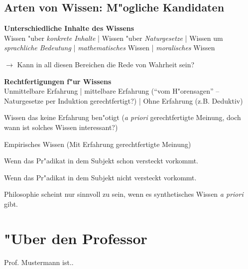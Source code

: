 \documentclass[emulatestandardclasses]{scrartcl}
\begin{document}
\subsection{Arten von Wissen: M"ogliche Kandidaten}
\textbf{Unterschiedliche Inhalte des Wissens}\\
Wissen "uber \emph{konkrete Inhalte} | Wissen "uber \emph{Naturgesetze} | Wissen um \emph{sprachliche Bedeutung} | \emph{mathematisches} Wissen | \emph{moralisches} Wissen

\hspace{3mm}$\rightarrow$ Kann in all diesen Bereichen die Rede von Wahrheit sein?
\newline

\noindent\textbf{Rechtfertigungen f"ur Wissens}\\
Unmittelbare Erfahrung | mittelbare Erfahrung ("`vom H"orensagen"' -- Naturgesetze per Induktion gerechtfertigt?) | Ohne Erfahrung (z.B. Deduktiv)

\begin{description}[leftmargin=!,labelwidth=\widthof{\bfseries A posteriorisches Wissen}]
  \item[A priorisches Wissen] Wissen das keine Erfahrung ben"otigt (\emph{a priori} gerechtfertigte Meinung, doch wann ist solches Wissen interessant?)
  \item[A posteriorisches Wissen] Empirisches Wissen (Mit Erfahrung gerechtfertigte Meinung)
  \item[Analytisches Urteil] Wenn das Pr"adikat in dem Subjekt schon versteckt vorkommt.
  \item[Synthetisches Urteil] Wenn das Pr"adikat in dem Subjekt nicht versteckt vorkommt.
\end{description}

\begin{center}
Philosophie scheint nur sinnvoll zu sein, wenn es synthetisches Wissen \emph{a priori} gibt.
\end{center}
\newpage
\section{"Uber den Professor}
Prof. Mustermann ist..


\end{document}
